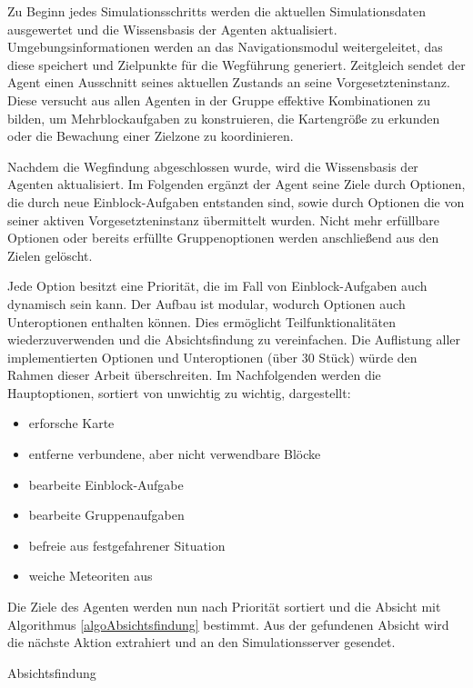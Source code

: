 \documentclass[runningheads]{llncs}
\begin{document}
	
	Zu Beginn jedes Simulationsschritts werden die aktuellen Simulationsdaten ausgewertet und die Wissensbasis der Agenten aktualisiert. Umgebungsinformationen werden an das Navigationsmodul weitergeleitet, das diese speichert und Zielpunkte für die Wegführung generiert. Zeitgleich sendet der Agent einen Ausschnitt seines aktuellen Zustands an seine Vorgesetzteninstanz. Diese versucht aus allen Agenten in der Gruppe effektive Kombinationen zu bilden, um Mehrblockaufgaben zu konstruieren, die Kartengröße zu erkunden oder die Bewachung einer Zielzone zu koordinieren.
	
	Nachdem die Wegfindung abgeschlossen wurde, wird die Wissensbasis der Agenten aktualisiert. Im Folgenden ergänzt der Agent seine Ziele durch Optionen, die durch neue Einblock-Aufgaben entstanden sind, sowie durch Optionen die von seiner aktiven Vorgesetzteninstanz übermittelt wurden. Nicht mehr erfüllbare Optionen oder bereits erfüllte Gruppenoptionen werden anschließend aus den Zielen gelöscht.
	
	Jede Option besitzt eine Priorität, die im Fall von Einblock-Aufgaben auch dynamisch sein kann. Der Aufbau ist modular, wodurch Optionen auch Unteroptionen enthalten können. Dies ermöglicht Teilfunktionalitäten wiederzuverwenden und die Absichtsfindung zu vereinfachen. Die Auflistung aller implementierten Optionen und Unteroptionen (über 30 Stück) würde den Rahmen dieser Arbeit überschreiten. Im Nachfolgenden werden die Hauptoptionen, sortiert von unwichtig zu wichtig, dargestellt:
	
	\begin{itemize}
		\item erforsche Karte
		\item entferne verbundene, aber nicht verwendbare Blöcke
		\item bearbeite Einblock-Aufgabe
		\item bearbeite Gruppenaufgaben
		\item befreie aus festgefahrener Situation
		\item weiche Meteoriten aus
	\end{itemize}
	
	Die Ziele des Agenten werden nun nach Priorität sortiert und die Absicht mit Algorithmus \ref{algoAbsichtsfindung} bestimmt. Aus der gefundenen Absicht wird die nächste Aktion extrahiert und an den Simulationsserver gesendet.
	
	\begin{algorithm}
		\caption{Absichtsfindung}\label{alg:two}
		\label{algoAbsichtsfindung}
	\end{algorithm}
	
\end{document}
